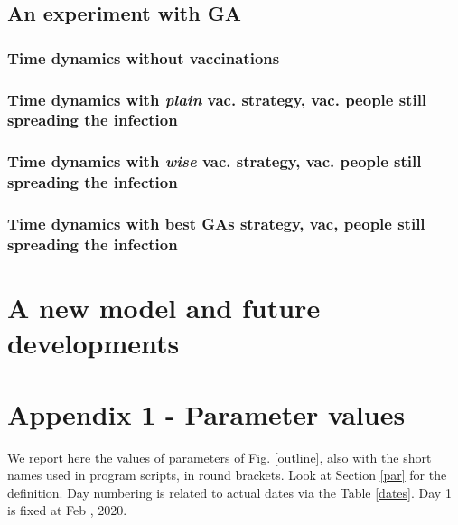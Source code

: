 \documentclass[graybox]{svmult}
\begin{document}
\subsection{An experiment with GA}
\label{GA}

\subsubsection{Time dynamics without vaccinations}
\label{dybWithout}

\subsubsection{Time dynamics with \emph{plain} vac. strategy, vac. people still spreading the infection}
\label{dynPlain}

\subsubsection{Time dynamics with \emph{wise} vac. strategy, vac. people still spreading the infection}
\label{dynWise}

\subsubsection{Time dynamics with best GAs strategy, vac, people still spreading the infection}
\label{dynGA}

\section{A new model and future developments}
\label{newModel}

\section{Appendix 1 - Parameter values}
\label{app1}

We report here the values of parameters of Fig. \ref{outline}, also with the short names used in program scripts, in round brackets. Look at Section \ref{par} for the definition. Day numbering is related to actual dates via the Table \ref{dates}. Day 1 is fixed at Feb , 2020.
\end{document}
